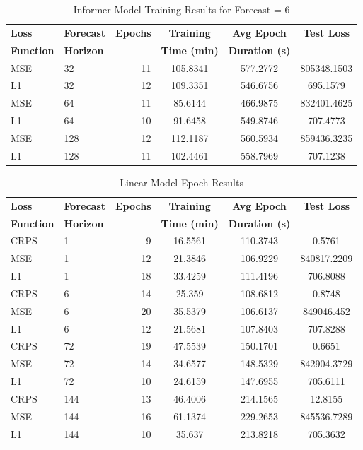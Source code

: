\documentclass{article}
\begin{document}
\begin{table}[!htbp]
    \centering
    \caption{Informer Model Training Results for Forecast = 6}
    \begin{tabular}{l|l|r|S|S|S}
        \toprule
        \textbf{Loss} & \textbf{Forecast} & \textbf{Epochs} & \textbf{Training} & \textbf{Avg Epoch} & \textbf{Test Loss} \\
        \textbf{Function} & \textbf{Horizon} & & \textbf{Time (min)} & \textbf{Duration (s)} & \\
        \midrule
        MSE & 32 & 11 & 105.8341 & 577.2772 & 805348.1503 \\
        L1 & 32 & 12 & 109.3351 & 546.6756 & 695.1579 \\
        \midrule
        MSE & 64 & 11 & 85.6144 & 466.9875 & 832401.4625 \\
        L1 & 64 & 10 & 91.6458 & 549.8746 & 707.4773 \\
        \midrule
        MSE & 128 & 12 & 112.1187 & 560.5934 & 859436.3235 \\
        L1 & 128 & 11 & 102.4461 & 558.7969 & 707.1238 \\
      \bottomrule
    \end{tabular}
    \label{tab:informer_training_f6}
    \end{table}

\begin{table}[!htbp]
    \footnotesize
    \centering
    \caption{Linear Model Epoch Results}
    \begin{tabular}{l|l|r|S|S|S}
        \toprule
        \textbf{Loss} & \textbf{Forecast} & \textbf{Epochs} & \textbf{Training} & \textbf{Avg Epoch} & \textbf{Test Loss} \\
        \textbf{Function} & \textbf{Horizon} & & \textbf{Time (min)} & \textbf{Duration (s)} & \\
        \midrule
        CRPS & 1 & 9 & 16.5561 & 110.3743 & 0.5761 \\
        MSE & 1 & 12 & 21.3846 & 106.9229 & 840817.2209 \\
        L1 & 1 & 18 & 33.4259 & 111.4196 & 706.8088 \\
        \midrule
        CRPS & 6 & 14 & 25.359 & 108.6812 & 0.8748 \\
        MSE & 6 & 20 & 35.5379 & 106.6137 & 849046.452 \\
        L1 & 6 & 12 & 21.5681 & 107.8403 & 707.8288 \\
        \midrule
        CRPS & 72 & 19 & 47.5539 & 150.1701 & 0.6651 \\
        MSE & 72 & 14 & 34.6577 & 148.5329 & 842904.3729 \\
        L1 & 72 & 10 & 24.6159 & 147.6955 & 705.6111 \\
        \midrule
        CRPS & 144 & 13 & 46.4006 & 214.1565 & 12.8155 \\
        MSE & 144 & 16 & 61.1374 & 229.2653 & 845536.7289 \\
        L1 & 144 & 10 & 35.637 & 213.8218 & 705.3632 \\
    \bottomrule
    \end{tabular}
    \label{tab:linear_epoch}
\end{table}
\end{document}
